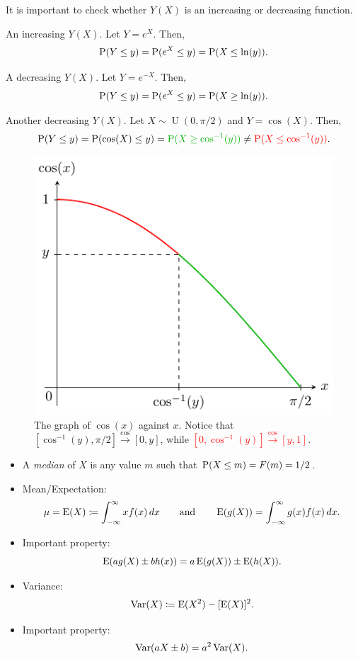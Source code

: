 \begin{note}
  It is important to check whether \(Y(X)\) is an increasing or decreasing function.
\end{note}
\begin{example}{An increasing \(Y(X)\).}{}
  Let \(Y=e^X\). Then,
  \[\operatorname{P}(Y\leq y)=\operatorname{P}(e^X\leq y)=\operatorname{P}(X\leq\ln(y)).\]
\end{example}
\begin{example}{A decreasing \(Y(X)\).}{}
  Let \(Y=e^{-X}\). Then,
  \[\operatorname{P}(Y\leq y)=\operatorname{P}(e^X\leq y)=\operatorname{P}(X\geq\ln(y)).\]
\end{example}
\begin{example}{Another decreasing \(Y(X)\).}{}
  Let \(X\sim\operatorname{U}(0,\pi/2)\) and \(Y=\cos(X)\). Then, 
  \[\Prob(Y\leq y)=\Prob(\cos(X)\leq y)=\textcolor{green!70!black}{\Prob(X\geq\cos^{-1}(y))}\neq \textcolor{red}{\Prob(X\leq\cos^{-1}(y))}.\]
  \begin{figure}[H]
    \centering
    \includegraphics{Diagrams/CRV-cosine/diagram.pdf}
    \caption{The graph of \(\cos(x)\) against \(x\). Notice that \textcolor{green!70!black}{\([\cos^{-1}(y),\pi/2]\stackrel{\cos}{\to}[0,y]\)}, while \textcolor{red}{\([0,\cos^{-1}(y)]\stackrel{\cos}{\to}[y,1]\)}.}
    \label{fig:CRV-cosine}
  \end{figure}
\end{example}
\begin{stbox}{}
  \begin{itemize}
    \item A \emph{median} of \(X\) is any value \(m\) such that \(\operatorname{P}(X\leq m)=F(m)=1/2\).
    \item Mean/Expectation: 
    \[\mu=\operatorname{E}(X)\coloneq \int_{-\infty}^{\infty}xf(x)\,dx \qquad\text{and}\qquad \operatorname{E}(g(X))=\int_{-\infty}^{\infty}g(x)f(x)\,dx.\]
    \item Important property: 
    \[\operatorname{E}(ag(X)\pm bh(x))=a\operatorname{E}(g(X))\pm\operatorname{E}(h(X)).\]
    \item Variance: 
    \[\operatorname{Var}(X)\coloneq \operatorname{E}(X^2)-[\operatorname{E}(X)]^2.\]
    \item Important property:
    \[\operatorname{Var}(aX\pm b)=a^2\operatorname{Var}(X).\]
  \end{itemize}
\end{stbox}